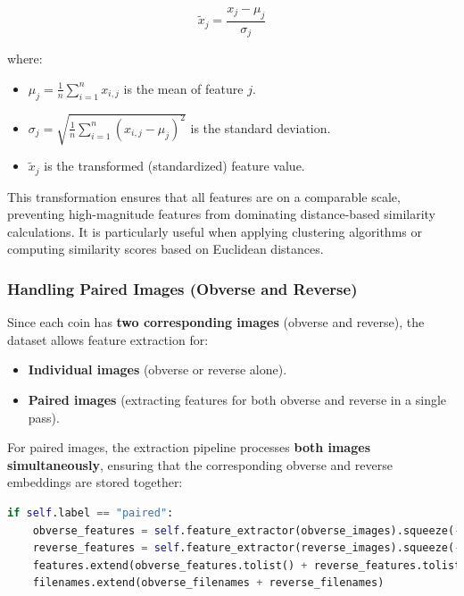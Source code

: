 \documentclass[nolibertine, english, algorithm, nomencl, minted]{ttlab-qualify}
\begin{document}
\begin{equation}
    \tilde{x}_j = \frac{x_j - \mu_j}{\sigma_j}
\end{equation}

where:
\begin{itemize}
    \item \( \mu_j = \frac{1}{n} \sum_{i=1}^{n} x_{i,j} \) is the mean of feature \( j \).
    \item \( \sigma_j = \sqrt{\frac{1}{n} \sum_{i=1}^{n} (x_{i,j} - \mu_j)^2} \) is the standard deviation.
    \item \( \tilde{x}_j \) is the transformed (standardized) feature value.
\end{itemize}

This transformation ensures that all features are on a comparable scale, 
preventing high-magnitude features from dominating distance-based similarity calculations. 
It is particularly useful when applying clustering algorithms or computing similarity scores based on Euclidean distances.


\subsubsection{Handling Paired Images (Obverse and Reverse)}
Since each coin has \textbf{two corresponding images} (obverse and reverse), the dataset allows feature extraction for:
\begin{itemize}
    \item \textbf{Individual images} (obverse or reverse alone).
    \item \textbf{Paired images} (extracting features for both obverse and reverse in a single pass).
\end{itemize}

For paired images, the extraction pipeline processes \textbf{both images simultaneously}, 
ensuring that the corresponding obverse and reverse embeddings are stored together:

\begin{footnotesize}
\begin{lstlisting}[language=Python, frame=single, breaklines=true]
if self.label == "paired":
    obverse_features = self.feature_extractor(obverse_images).squeeze(-1).squeeze(-1)
    reverse_features = self.feature_extractor(reverse_images).squeeze(-1).squeeze(-1)
    features.extend(obverse_features.tolist() + reverse_features.tolist())
    filenames.extend(obverse_filenames + reverse_filenames)
\end{lstlisting}
\end{footnotesize}
\end{document}
